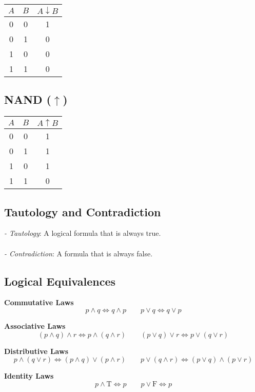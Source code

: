 \begin{multicols}{2}
\begin{tabular}{ccc}
\toprule
$A$ & $B$ & $A \downarrow B$ \\
\midrule
0 & 0 & 1 \\
0 & 1 & 0 \\
1 & 0 & 0 \\
1 & 1 & 0 \\
\bottomrule
\end{tabular}

\vspace{1em}

\subsection*{NAND ($\uparrow$)}

\begin{tabular}{ccc}
\toprule
$A$ & $B$ & $A \uparrow B$ \\
\midrule
0 & 0 & 1 \\
0 & 1 & 1 \\
1 & 0 & 1 \\
1 & 1 & 0 \\
\bottomrule
\end{tabular}

\end{multicols}
\medskip
\subsection{Tautology and Contradiction}
\smallskip
\textit{- Tautology}: A logical formula that is always true.
\\\\
\textit{- Contradiction}: A formula that is always false.
\newpage
\subsection{Logical Equivalences}
\smallskip
\textbf{Commutative Laws}
\[
p \land q \Leftrightarrow q \land p \qquad p \lor q \Leftrightarrow q \lor p
\]

\textbf{Associative Laws}
\[
(p \land q) \land r \Leftrightarrow p \land (q \land r) \qquad (p \lor q) \lor r \Leftrightarrow p \lor (q \lor r)
\]

\textbf{Distributive Laws}
\[
p \land (q \lor r) \Leftrightarrow (p \land q) \lor (p \land r) \qquad
p \lor (q \land r) \Leftrightarrow (p \lor q) \land (p \lor r)
\]

\textbf{Identity Laws}
\[
p \land \text{T} \Leftrightarrow p \qquad p \lor \text{F} \Leftrightarrow p
\]

